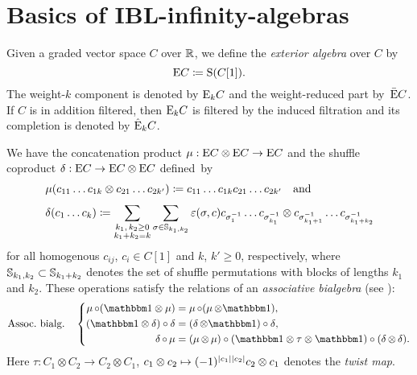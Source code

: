 \documentclass[\MainFolder/Text.tex]{subfiles}
\begin{document}
\section{Basics of IBL-infinity-algebras
}
\allowdisplaybreaks
\label{Sec:Alg1}

\begin{Definition}\label{Def:ExtAlg}
Given a graded vector space $C$ over $\mathbb{R}$, we define the \emph{exterior algebra} over $C$ by
\[ \mathrm{E} C \coloneqq \mathrm{S}(C[1]). \]
The weight-$k$ component is denoted by $\mathrm{E}_k C$ and the weight-reduced part by~$\bar{\mathrm{E}} C$. If $C$ is in addition filtered, then $\mathrm{E}_k C$ is filtered by the induced filtration and its completion is denoted by $\hat{\mathrm{E}}_k C$.
\end{Definition}


We have the concatenation product $\operatorname{\mu} : \mathrm{E} C \otimes \mathrm{E} C \rightarrow \mathrm{E} C$ and the shuffle coproduct $\operatorname{\delta}: \mathrm{E} C \rightarrow \mathrm{E} C\otimes \mathrm{E} C$ defined~by
\begin{align*}
&\operatorname{\mu}(c_{11}\dots c_{1k} \otimes c_{21} \dots c_{2k'}) \coloneqq c_{11} \dots c_{1k} c_{21} \dots c_{2k'}\quad\text{and}\\[\jot]
&\operatorname{\delta}(c_1 \dots c_k) \coloneqq \sum_{\substack{k_1,\,k_2 \ge 0\\ k_1 + k_2 = k}} \sum_{\sigma\in \mathbb{S}_{k_1, k_2}} \varepsilon(\sigma,c) c_{\sigma^{-1}_1} \dots c_{\sigma_{k_1}^{-1}}\otimes c_{\sigma_{k_1+1}^{-1}}\dots c_{\sigma_{k_1 + k_2}^{-1}}
\end{align*}
for all homogenous $c_{ij}$, $c_i \in C[1]$ and $k$, $k'\ge 0$, respectively, where $\mathbb{S}_{k_1, k_2}\subset \mathbb{S}_{k_1+k_2}$ denotes the set of shuffle permutations with blocks of lengths $k_1$ and $k_2$. These operations satisfy the relations of an \emph{associative bialgebra} (see \cite{Loday2012}):
\begin{equation}\label{Eq:Bialgebra}
\text{Assoc.~bialg.}\quad \left\{
\begin{aligned}
\Prod\circ (\Id\otimes \Prod) &= \Prod\circ (\Prod \otimes \Id), \\ 
(\Id\otimes \CoProd)\circ\CoProd &= (\CoProd\otimes \Id)\circ \CoProd, \\
\CoProd \circ \Prod &= (\Prod\otimes \Prod) \circ (\Id \otimes \tau\otimes \Id) \circ (\CoProd\otimes \CoProd).
\end{aligned} \right.
\end{equation}
Here $\tau: C_1 \otimes C_2 \rightarrow C_2 \otimes C_1$, $c_1\otimes c_2 \mapsto (-1)^{|c_1||c_2|}c_2\otimes c_1$ denotes the \emph{twist map}.
\end{document}
